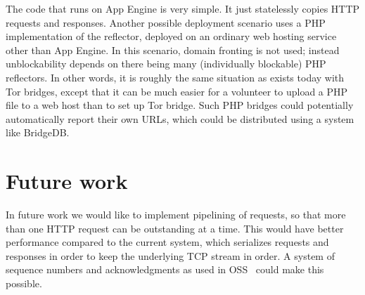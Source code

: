 \documentclass[conference]{IEEEtran}
\def\meek{meek}
\begin{document}
The code that runs on App Engine is very simple.
It just statelessly copies HTTP requests and responses.
Another possible deployment scenario uses a PHP implementation of the reflector,
deployed on an ordinary web hosting service other than App Engine.
In this scenario, domain fronting is not used;
instead unblockability depends on there being many (individually blockable) PHP reflectors.
In other words, it is roughly the same situation as exists today with Tor bridges,
except that it can be much easier for a volunteer to upload a PHP file to a web host
than to set up Tor bridge.
Such PHP bridges could potentially automatically report their own URLs,
which could be distributed using a system like BridgeDB.



\section{Future work}
\label{sec:futurework}

In future work we would like to implement pipelining of requests,
so that more than one HTTP request can be outstanding at a time.
This would have better performance compared to the current system,
which serializes requests and responses in order to keep the
underlying TCP stream in order.
A system of sequence numbers and acknowledgments as used in OSS~\cite{oss}
could make this possible.
\end{document}
